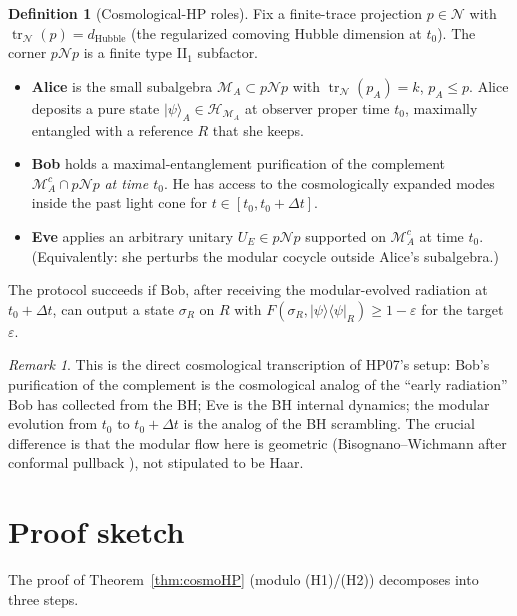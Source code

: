 \documentclass[11pt]{article}
\theoremstyle{definition}
\newtheorem{definition}[theorem]{Definition}
\theoremstyle{remark}
\newtheorem*{remark}{Remark}
\newcommand{\HH}{\mathcal{H}}
\newcommand{\N}{\mathcal{N}}
\newcommand{\M}{\mathcal{M}}
\newcommand{\tr}{\operatorname{tr}}
\begin{document}
\begin{definition}[Cosmological-HP roles]\label{def:roles}
Fix a finite-trace projection $p\in\N$ with $\tr_\N(p)=d_{\mathrm{Hubble}}$
(the regularized comoving Hubble dimension at $t_0$). The corner $p\N p$
is a finite type II$_1$ subfactor.
\begin{itemize}[leftmargin=2em]
\item \textbf{Alice} is the small subalgebra $\M_A\subset p\N p$ with
      $\tr_\N(p_A)=k$, $p_A\le p$. Alice deposits a pure state
      $|\psi\rangle_A\in\HH_{\M_A}$ at observer proper time $t_0$,
      maximally entangled with a reference $R$ that she keeps.
\item \textbf{Bob} holds a maximal-entanglement purification of the
      complement $\M_A^c\cap p\N p$ \emph{at time $t_0$}. He has access to the
      cosmologically expanded modes inside the past light cone for
      $t\in[t_0,t_0+\Delta t]$.
\item \textbf{Eve} applies an arbitrary unitary $U_E\in p\N p$ supported
      on $\M_A^c$ at time $t_0$. (Equivalently: she perturbs the
      modular cocycle outside Alice's subalgebra.)
\end{itemize}
The protocol succeeds if Bob, after receiving the modular-evolved radiation
at $t_0+\Delta t$, can output a state $\sigma_R$ on $R$ with
$F(\sigma_R,|\psi\rangle\!\langle\psi|_R)\ge 1-\varepsilon$ for the target
$\varepsilon$.
\end{definition}

\begin{remark}
This is the direct cosmological transcription of HP07's setup: Bob's
purification of the complement is the cosmological analog of the
``early radiation'' Bob has collected from the BH; Eve is the BH
internal dynamics; the modular evolution from $t_0$ to $t_0+\Delta t$ is
the analog of the BH scrambling. The crucial difference is that the
modular flow here is geometric (Bisognano--Wichmann after conformal
pullback \cite{HislopLongo82,frwnote}), not stipulated to be Haar.
\end{remark}

\section{Proof sketch}
\label{sec:proof}

The proof of Theorem~\ref{thm:cosmoHP} (modulo (H1)/(H2)) decomposes into
three steps.
\end{document}
